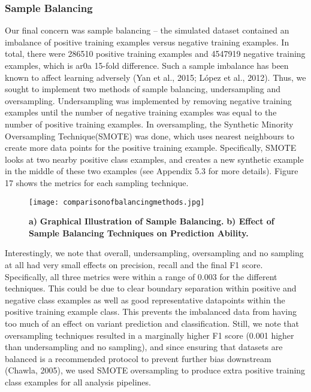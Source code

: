 \documentclass{article}
\begin{document}
\subsubsection{Sample Balancing}
Our final concern was sample balancing -- the simulated dataset contained an imbalance of positive training examples versus negative training examples. In total, there were 286510 positive training examples and 4547919 negative training examples, which is ar0a 15-fold difference. Such a sample imbalance has been known to affect learning adversely (Yan et al., 2015; López et al., 2012). Thus, we sought to implement two methods of sample balancing, undersampling and oversampling. Undersampling was implemented by removing negative training examples until the number of negative training examples was equal to the number of positive training examples. In oversampling, the Synthetic Minority Oversampling Technique(SMOTE) was done, which uses nearest neighbours to create more data points for the positive training example. Specifically, SMOTE looks at two nearby positive class examples, and creates a new synthetic example in the middle of these two examples (see Appendix 5.3 for more details). Figure 17 shows the metrics for each sampling technique.
\begin{figure}[H]
\centering
\texttt{[image: comparisonofbalancingmethods.jpg]}
\caption{\textbf{a)} \textbf{Graphical Illustration of Sample Balancing.} \textbf{b) Effect of Sample Balancing Techniques on Prediction Ability.}}
\end{figure}
Interestingly, we note that overall, undersampling, oversampling and no sampling at all had very small effects on precision, recall and the final F1 score. Specifically, all three metrics were within a range of 0.003 for the different techniques. This could be due to clear boundary separation within positive and negative class examples as well as good representative datapoints within the positive training example class. This prevents the imbalanced data from having too much of an effect on variant prediction and classification. Still, we note that oversampling techniques resulted in a marginally higher F1 score (0.001 higher than undersampling and no sampling), and since ensuring that datasets are balanced is a recommended protocol to prevent further bias downstream (Chawla, 2005), we used SMOTE oversampling to produce extra positive training class examples for all analysis pipelines.
\end{document}
